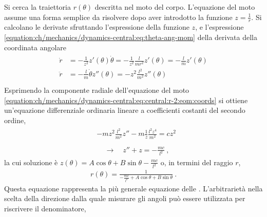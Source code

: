 \documentclass[letterpaper,10pt,italian]{jupyterBook}
\begin{document}
\sphinxAtStartPar
Si cerca la traiettoria \(r(\theta)\) descritta nel moto del corpo. L’equazione del moto assume una forma semplice da risolvere dopo aver introdotto la funzione \(z = \frac{1}{r}\). Si calcolano le derivate sfruttando l’espressione della funzione \(z\), e l’espressione \eqref{equation:ch/mechanics/dynamics-central:eq:theta-ang-mom} della derivata della coordinata angolare
\begin{equation*}
\begin{split}\begin{aligned}
   \dot{r} & = -\frac{1}{z^2} z'(\theta) \dot{\theta} = -\frac{1}{z^2} \frac{l}{m r^2} z'(\theta) = - \frac{l}{m} z'(\theta) \\
  \ddot{r} & = - \frac{l}{m} \dot{\theta} z''(\theta) = - z^2 \frac{l^2}{m^2} z''(\theta) \\
\end{aligned}\end{split}
\end{equation*}
\sphinxAtStartPar
Esprimendo la componente radiale dell’equazione del moto \eqref{equation:ch/mechanics/dynamics-central:eq:central:r-2:eom:coords} si ottiene un’equazione differenziale ordinaria lineare a coefficienti costanti del secondo ordine,
\begin{equation*}
\begin{split}\begin{aligned}
  & - m z^2 \frac{l^2}{m^2} z'' - m \frac{1}{z} \frac{l^2 z^4}{m^2} = c z^2 \\
\end{aligned}\end{split}
\end{equation*}\begin{equation*}
\begin{split} \quad \rightarrow \quad z'' + z = - \frac{m c }{l^2} \ ,\end{split}
\end{equation*}
\sphinxAtStartPar
la cui soluzione è \(z(\theta) = A \cos \theta + B \sin \theta - \frac{m c}{l^2}\) o, in termini del raggio \(r\),
\begin{equation*}
\begin{split}r(\theta) = \frac{1}{- \frac{m c}{l^2} + A \cos \theta + B \sin \theta} \ .\end{split}
\end{equation*}
\sphinxAtStartPar
Questa equazione rappresenta la più generale equazione delle . L’arbitrarietà nella scelta della direzione dalla quale misurare gli angoli può essere utilizzata per riscrivere il denominatore,
\end{document}
